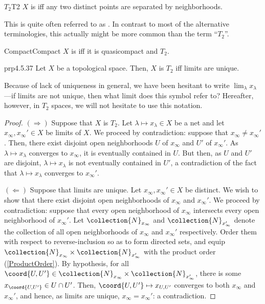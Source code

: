 \begin{dfn}{$T_2$}{T2}
$X$ is  iff any two distinct points are separated by neighborhoods.
\begin{rmk}
This is quite often referred to as .  In contrast to most of the alternative terminologies, this actually might be more common than the term ``$T_2$''.
\end{rmk}
\end{dfn}
\begin{dfn}{Compact}{Compact}
$X$ is  iff it is quasicompact and $T_2$.
\end{dfn}
\begin{prp}{}{prp4.5.37}
Let $X$ be a topological space.  Then, $X$ is $T_2$ iff limits are unique.
\begin{rmk}
Because of lack of uniqueness in general, we have been hesitant to write $\lim _\lambda x_\lambda$---if limits are not unique, then what limit does this symbol refer to?  Hereafter, however, in $T_2$ spaces, we will not hesitate to use this notation.
\end{rmk}
\begin{proof}
$(\Rightarrow )$ Suppose that $X$ is $T_2$.  Let $\lambda \mapsto x_\lambda \in X$ be a net and let $x_\infty ,x_\infty '\in X$ be limits of $X$.  We proceed by contradiction:  suppose that $x_\infty \neq x_\infty '$.  Then, there exist disjoint open neighborhoods $U$ of $x_\infty$ and $U'$ of $x_\infty '$.  As $\lambda \mapsto x_\lambda$ converges to $x_\infty$, it is eventually contained in $U$.  But then, as $U$ and $U'$ are disjoint, $\lambda \mapsto x_\lambda$ is not eventually contained in $U'$, a contradiction of the fact that $\lambda \mapsto x_{\lambda}$ converges to $x_{\infty}'$.

\blankline
\noindent
$(\Leftarrow )$ Suppose that limits are unique.  Let $x_\infty ,x_\infty '\in X$ be distinct.  We wish to show that there exist disjoint open neighborhoods of $x_\infty$ and $x_\infty '$.  We proceed by contradiction:  suppose that every open neighborhood of $x_\infty$ intersects every open neighborhood of $x_\infty '$.  Let $\collection{N}_{x_{\infty}}$ and $\collection{N}_{x_{\infty}'}$ denote the collection of all open neighborhoods of $x_{\infty}$ and $x_{\infty}'$ respectively.  Order them with respect to reverse-inclusion so as to form directed sets, and equip $\collection{N}_{x_{\infty}}\times \collection{N}_{x_{\infty}'}$ with the product order (\cref{ProductOrder}).  By hypothesis, for all $\coord{U,U'}\in \collection{N}_{x_{\infty}}\times \collection{N}_{x_{\infty}'}$, there is some $x_{\coord{U,U'}}\in U\cap U'$.  Then, $\coord{U,U'}\mapsto x_{U,U'}$ converges to both $x_{\infty}$ and $x_{\infty}'$, and hence, as limits are unique, $x_{\infty}=x_{\infty}'$:  a contradiction.
\end{proof}
\end{prp}
